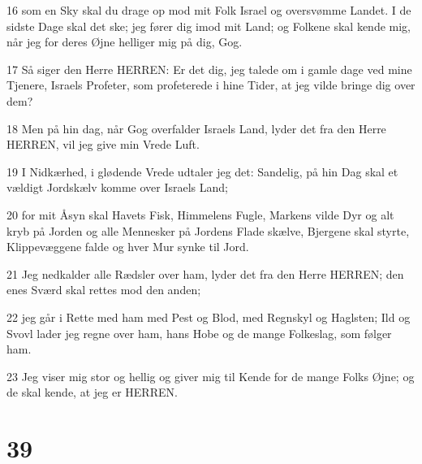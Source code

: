 \par 16 som en Sky skal du drage op mod mit Folk Israel og oversvømme Landet. I de sidste Dage skal det ske; jeg fører dig imod mit Land; og Folkene skal kende mig, når jeg for deres Øjne helliger mig på dig, Gog.
\par 17 Så siger den Herre HERREN: Er det dig, jeg talede om i gamle dage ved mine Tjenere, Israels Profeter, som profeterede i hine Tider, at jeg vilde bringe dig over dem?
\par 18 Men på hin dag, når Gog overfalder Israels Land, lyder det fra den Herre HERREN, vil jeg give min Vrede Luft.
\par 19 I Nidkærhed, i glødende Vrede udtaler jeg det: Sandelig, på hin Dag skal et vældigt Jordskælv komme over Israels Land;
\par 20 for mit Åsyn skal Havets Fisk, Himmelens Fugle, Markens vilde Dyr og alt kryb på Jorden og alle Mennesker på Jordens Flade skælve, Bjergene skal styrte, Klippevæggene falde og hver Mur synke til Jord.
\par 21 Jeg nedkalder alle Rædsler over ham, lyder det fra den Herre HERREN; den enes Sværd skal rettes mod den anden;
\par 22 jeg går i Rette med ham med Pest og Blod, med Regnskyl og Haglsten; Ild og Svovl lader jeg regne over ham, hans Hobe og de mange Folkeslag, som følger ham.
\par 23 Jeg viser mig stor og hellig og giver mig til Kende for de mange Folks Øjne; og de skal kende, at jeg er HERREN.

\chapter{39}

